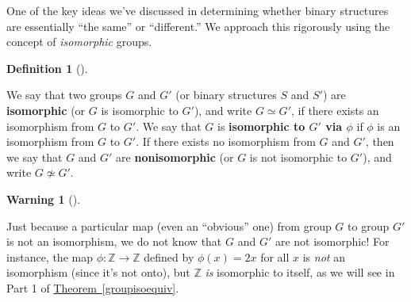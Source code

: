 \documentclass[10pt,]{book}
\newcommand{\terminology}[1]{\textbf{#1}}
\theoremstyle{plain}
\theoremstyle{definition}
\newtheorem{definition}[theorem]{Definition}
\theoremstyle{definition}
\newtheorem{warning}[theorem]{Warning}
\theoremstyle{definition}
\theoremstyle{definition}
\numberwithin{equation}{section}
\def\Z{\mathbb{Z}}
\begin{document}
    One of the key ideas we've discussed in determining whether binary
    structures are essentially ``the same'' or ``different.'' We approach
    this rigorously using the concept of \emph{isomorphic} groups.
\begin{definition}[{}]\label{definition-31}

        We say that two groups \(G\) and \(G'\) (or binary
        structures \(S\) and \(S'\)) are \terminology{isomorphic} (or \(G\) is isomorphic to \(G'\)), and write
        \(G\simeq G'\), if there exists an isomorphism from \(G\) to \(G'\).
        We say that \(G\) is \terminology{isomorphic to \(G'\) via \(\phi\)} if
        \(\phi\) is an isomorphism from \(G\) to \(G'\). If there exists no
        isomorphism from \(G\) and \(G'\), then we say that \(G\) and \(G'\)
        are \terminology{nonisomorphic} (or \(G\) is not isomorphic to \(G'\)), and write \(G\not\simeq G'\).
\label{notation-49}
\label{notation-50}
\end{definition}
\begin{warning}[]\label{warning-12}

      Just because a particular map (even an
      ``obvious'' one) from group \(G\) to group \(G'\) is not an isomorphism,
      we do not know that \(G\) and \(G'\) are not isomorphic! For instance,
      the map \(\phi: \Z\to \Z\) defined by \(\phi(x)=2x\) for all \(x\) is \emph{not}
      an isomorphism (since it's not onto), but \(\Z\) \emph{is} isomorphic to itself, as we will see in Part 1 of \hyperref[groupisoequiv]{Theorem~\ref{groupisoequiv}}.
\end{warning}
\par
\end{document}
